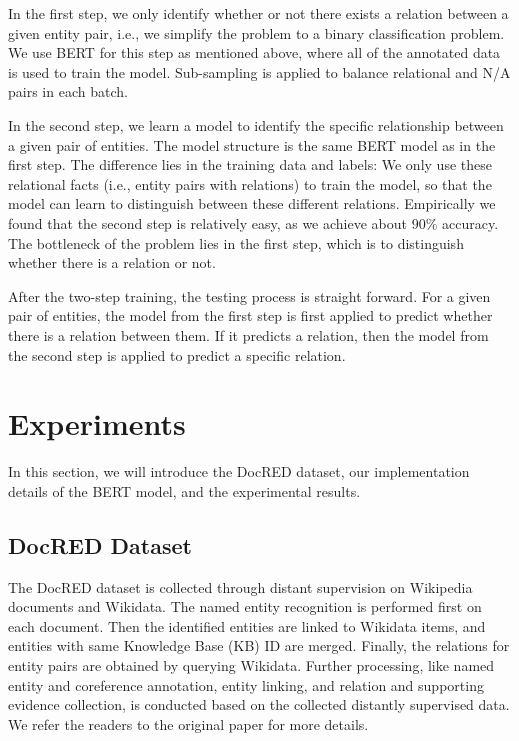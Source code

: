 \documentclass[11pt,a4paper]{article}
\begin{document}
In the first step, we only identify whether or not there exists a relation between a given entity pair, i.e., we simplify the problem to a binary classification problem. We use BERT for this step as mentioned above,  where all of the annotated data is used to train the model. Sub-sampling is applied to balance relational and N/A pairs in each batch.

In the second step, we learn a model to identify the specific relationship between a given pair of entities. The model structure is the same BERT model as in the first step. The difference lies in the training data and labels: We only use these relational facts (i.e., entity pairs with relations) to train the model, so that the model can learn to distinguish between these different relations. Empirically we found that the second step is relatively easy, as we achieve about $90\%$ accuracy. The bottleneck of the problem lies in the first step, which is to distinguish whether there is a relation or not.

After the two-step training, the testing process is straight forward. For a given pair of entities, the model from the first step is first applied to predict whether there is a relation between them. If it predicts a relation, then the model from the second step is applied to predict a specific relation.

\section{Experiments}
In this section, we will introduce the DocRED dataset, our implementation details of the BERT model, and the experimental results.

\subsection{DocRED Dataset}
The DocRED dataset is collected through distant supervision \cite{DistantSupervision} on Wikipedia documents and Wikidata. The named entity recognition is performed first on each document. Then the identified entities are linked to Wikidata items, and entities with same Knowledge Base (KB) ID are merged. Finally, the relations for entity pairs are obtained by querying Wikidata. Further processing, like named entity and coreference annotation, entity linking, and relation and supporting evidence collection, is conducted based on the collected distantly supervised data. We refer the readers to the original paper \cite{yao2019DocRED} for more details.
\end{document}
